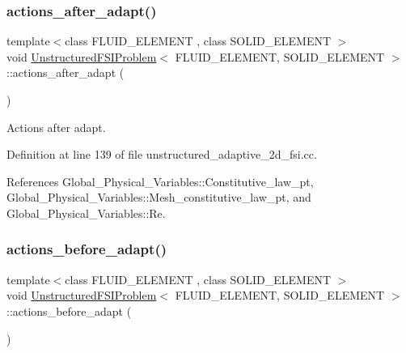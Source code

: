 \subsubsection{\texorpdfstring{actions\+\_\+after\+\_\+adapt()}{actions\_after\_adapt()}}
{\footnotesize\ttfamily template$<$class F\+L\+U\+I\+D\+\_\+\+E\+L\+E\+M\+E\+NT , class S\+O\+L\+I\+D\+\_\+\+E\+L\+E\+M\+E\+NT $>$ \\
void \hyperlink{classUnstructuredFSIProblem}{Unstructured\+F\+S\+I\+Problem}$<$ F\+L\+U\+I\+D\+\_\+\+E\+L\+E\+M\+E\+NT, S\+O\+L\+I\+D\+\_\+\+E\+L\+E\+M\+E\+NT $>$\+::actions\+\_\+after\+\_\+adapt (\begin{DoxyParamCaption}{ }\end{DoxyParamCaption})\hspace{0.3cm}{\ttfamily [inline]}}



Actions after adapt. 



Definition at line 139 of file unstructured\+\_\+adaptive\+\_\+2d\+\_\+fsi.\+cc.



References Global\+\_\+\+Physical\+\_\+\+Variables\+::\+Constitutive\+\_\+law\+\_\+pt, Global\+\_\+\+Physical\+\_\+\+Variables\+::\+Mesh\+\_\+constitutive\+\_\+law\+\_\+pt, and Global\+\_\+\+Physical\+\_\+\+Variables\+::\+Re.

\mbox{\label{classUnstructuredFSIProblem_a47a4307323e4dd598fdca542144f4bd2}} 
\subsubsection{\texorpdfstring{actions\+\_\+before\+\_\+adapt()}{actions\_before\_adapt()}}
{\footnotesize\ttfamily template$<$class F\+L\+U\+I\+D\+\_\+\+E\+L\+E\+M\+E\+NT , class S\+O\+L\+I\+D\+\_\+\+E\+L\+E\+M\+E\+NT $>$ \\
void \hyperlink{classUnstructuredFSIProblem}{Unstructured\+F\+S\+I\+Problem}$<$ F\+L\+U\+I\+D\+\_\+\+E\+L\+E\+M\+E\+NT, S\+O\+L\+I\+D\+\_\+\+E\+L\+E\+M\+E\+NT $>$\+::actions\+\_\+before\+\_\+adapt (\begin{DoxyParamCaption}{ }\end{DoxyParamCaption})\hspace{0.3cm}{\ttfamily [inline]}}



